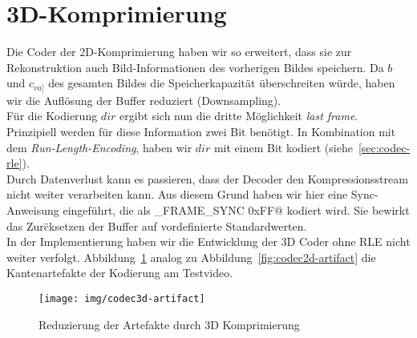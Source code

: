 \section{3D-Komprimierung}
\label{sec:codec3d}
Die Coder der 2D-Komprimierung haben wir so erweitert, dass sie zur
Rekonstruktion auch Bild-Informationen des vorherigen Bildes speichern. Da $b$
und $c_{va]}$ des gesamten Bildes die Speicherkapazit\"at \"uberschreiten
w\"urde, haben wir die Aufl\"osung der Buffer reduziert (Downsampling).
\\
F\"ur die Kodierung $dir$ ergibt sich nun die dritte M\"oglichkeit \textit{last
frame}. Prinzipiell werden f\"ur diese Information zwei Bit ben\"otigt. In
Kombination mit dem \textit{Run-Length-Encoding}, haben wir $dir$ mit einem Bit
kodiert (siehe~\ref{sec:codec-rle}).
\\
Durch Datenverlust kann es passieren, dass der Decoder den Kompressionsstream
nicht weiter verarbeiten kann. Aus diesem Grund haben wir hier eine
Sync-Anweisung eingef\"uhrt, die als \verb@CMPR_FRAME_SYNC 0xFF@ kodiert wird.
Sie bewirkt das Zur\"cksetzen der Buffer auf vordefinierte Standardwerten.
\\
In der Implementierung haben wir die Entwicklung der 3D Coder ohne RLE nicht
weiter verfolgt. Abbildung~\ref{fig:codec3d-artifact} analog zu
Abbildung~\ref{fig:codec2d-artifact} die Kantenartefakte der Kodierung am
Testvideo.
%
\begin{figure}[tbhp]
\begin{center}
\texttt{[image: img/codec3d-artifact]}
\end{center}
\caption{Reduzierung der Artefakte durch 3D Komprimierung}
\label{fig:codec3d-artifact}
\end{figure}
%
%
%
%

